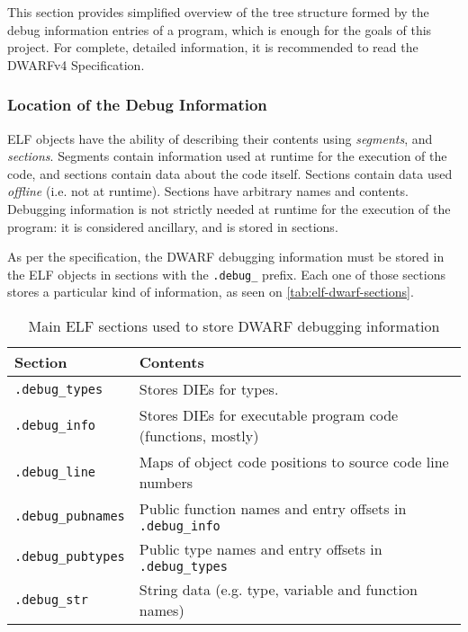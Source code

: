This section provides simplified overview of the tree structure formed by the
debug information entries of a program, which is enough for the goals of this
project. For complete, detailed information, it is recommended to read the
DWARFv4 Specification.


\subsubsection{Location of the Debug Information}

\Gls{ELF} objects have the ability of describing their contents using
\emph{segments}, and \emph{sections}. Segments contain information used at
runtime for the execution of the code, and sections contain data about the
code itself. Sections contain data used \emph{offline} (i.e. not at runtime).
Sections have arbitrary names and contents. Debugging information is not
strictly needed at runtime for the execution of the program: it is considered
ancillary, and is stored in sections.

As per the specification, the DWARF debugging information must be stored in
the ELF objects in sections with the \verb|.debug_| prefix. Each one of those
sections stores a particular kind of information, as seen on
\autoref{tab:elf-dwarf-sections}. 


\begin{table}
  \centering\small
  \begin{tabular}{lp{}}
    \toprule
    Section & Contents \\
    \midrule
    \verb|.debug_types| & Stores DIEs for types. \\
    \verb|.debug_info| & Stores DIEs for executable program code (functions, mostly) \\
    \verb|.debug_line| & Maps of object code positions to source code line numbers \\
    \verb|.debug_pubnames| & Public function names and entry offsets in \verb|.debug_info| \\
    \verb|.debug_pubtypes| & Public type names and entry offsets in \verb|.debug_types| \\
    \verb|.debug_str| & String data (e.g. type, variable and function names) \\
    \bottomrule
  \end{tabular}
  \caption{Main ELF sections used to store DWARF debugging information}
  \label{tab:elf-dwarf-sections}
\end{table}


